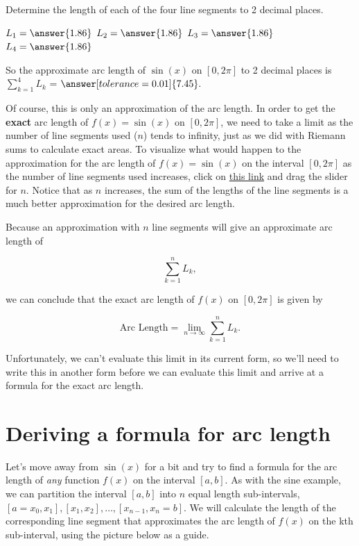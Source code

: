 \documentclass[handout,nooutcomes]{ximera}
\begin{document}

\begin{problem}
Determine the length of each of the four line segments to 2 decimal places.

$L_1 = \answer{1.86}$
$L_2 = \answer{1.86}$
$L_3 = \answer{1.86}$
$L_4 = \answer{1.86}$

So the approximate arc length of $\sin(x)$ on $[0, 2\pi]$ to 2 decimal places is $\displaystyle\sum_{k=1}^4 L_k$ = $\answer[tolerance=0.01]{7.45}.$
\end{problem}

Of course, this is only an approximation of the arc length.  In order to get the \textbf{exact} arc length of $f(x) = \sin(x)$ on $[0, 2\pi]$, we need to take a limit as the number of line segments used ($n$) tends to infinity, just as we did with Riemann sums to calculate exact areas.  To visualize what would happen to the approximation for the arc length of $f(x)=\sin(x)$ on the interval $[0,2\pi]$ as the number of line segments used increases, click on \href{https://www.desmos.com/calculator/lmz7n25cgl}{this link} and drag the slider for $n$.  Notice that as $n$ increases, the sum of the lengths of the line segments is a much better approximation for the desired arc length.  

Because an approximation with $n$ line segments will give an approximate arc length of 

$$\displaystyle\sum_{k=1}^n L_k,$$ 

we can conclude that the exact arc length of $f(x)$ on $[0, 2\pi]$ is given by 

$$\text{Arc Length} = \displaystyle\lim_{n \to \infty} \displaystyle\sum_{k=1}^n L_k.$$  

Unfortunately, we can't evaluate this limit in its current form, so we'll need to write this in another form before we can evaluate this limit and arrive at a formula for the exact arc length.  \\

\section {Deriving a formula for arc length}

Let's move away from $\sin(x)$ for a bit and try to find a formula for the arc length of \textit{any} function $f(x)$ on the interval $[a,b].$  As with the sine example, we can partition the interval $[a,b]$ into $n$ equal length sub-intervals, $[a=x_0, x_1], [x_1, x_2], \dots , [x_{n-1}, x_n = b].$  We will calculate the length of the corresponding line segment that approximates the arc length of $f(x)$ on the kth sub-interval, using the picture below as a guide.  
\end{document}
